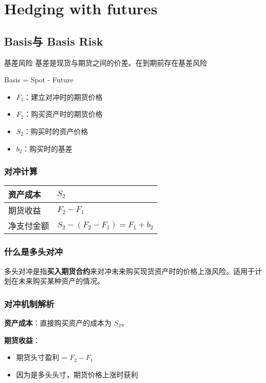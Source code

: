 \chapter{Hedging with futures}


\section{Basis与 Basis Risk}
基差风险
基差是现货与期货之间的价差。在到期前存在基差风险

Basis = Spot  - Future 

\begin{itemize}
    \item $F_1$：建立对冲时的期货价格
    \item $F_2$：购买资产时的期货价格
    \item $S_2$：购买时的资产价格
    \item $b_2$：购买时的基差
\end{itemize}

\subsection{对冲计算}

\begin{table}[h]
\centering
\begin{tabular}{|l|l|}
\hline
资产成本 & $S_2$ \\
\hline
期货收益 & $F_2 - F_1$ \\
\hline
净支付金额 & $S_2 - (F_2 - F_1) = F_1 + b_2$ \\
\hline
\end{tabular}
\end{table}

\subsection{什么是多头对冲}

多头对冲是指\textbf{买入期货合约}来对冲未来购买现货资产时的价格上涨风险。适用于计划在未来购买某种资产的情况。

\subsection{对冲机制解析}

\textbf{资产成本}：直接购买资产的成本为 $S_2$。

\textbf{期货收益}：
\begin{itemize}
    \item 期货头寸盈利 = $F_2 - F_1$
    \item 因为是多头头寸，期货价格上涨时获利
\end{itemize}

